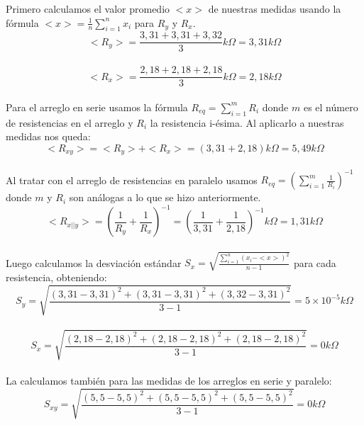 \documentclass[12pt]{article}
\begin{document}
	\noindent Primero calculamos el valor promedio $<x>$ de nuestras medidas usando la fórmula $<x> = \frac{1}{n}\sum_{i=1}^n x_i$ para $R_y$ y $R_x$.
	\\
	\begin{equation*}
		<R_y> = \frac{3,31 + 3,31 + 3,32}{3} k\Omega = 3,31 k\Omega
	\end{equation*}
	\\
	\begin{equation*}
		<R_x> = \frac{2,18 + 2,18 + 2,18}{3} k\Omega = 2,18 k\Omega
	\end{equation*}
	\\
	\noindent Para el arreglo en serie usamos la fórmula $R_{eq} = \sum_{i=1}^m R_i$ donde $m$ es el número de resistencias en el arreglo y $R_i$ la resistencia i-ésima. Al aplicarlo a nuestras medidas nos queda:\\
	\begin{equation*}
		<R_{xy}> = <R_y> + <R_x> = (3,31 + 2,18)k\Omega = 5,49k\Omega
	\end{equation*}
	\\
	\noindent Al tratar con el arreglo de resistencias en paralelo usamos $R_{eq} = (\sum_{i=1}^m \frac{1}{R_i})^{-1}$ donde $m$ y $R_i$ son análogas a lo que se hizo anteriormente.\\
	\begin{equation*}
		<R_{x||y}> = (\frac{1}{R_y} + \frac{1}{R_x})^{-1} = (\frac{1}{3,31} + \frac{1}{2,18})^{-1}k\Omega = 1,31k\Omega
	\end{equation*}
	\\
	\noindent Luego calculamos la desviación estándar $S_x = \sqrt{\frac{\sum_{i=1}^n(x_i - <x>)^2}{n - 1}}$ para cada resistencia, obteniendo:\\
	\begin{equation*}
		S_y = \sqrt{\frac{(3,31 - 3,31)^2 + (3,31 - 3,31)^2 + (3,32 - 3,31)^2}{3 - 1}} = 5 \times 10^{-5} k\Omega
	\end{equation*}
	\\
	\begin{equation*}
		S_x = \sqrt{\frac{(2,18 - 2,18)^2 + (2,18 - 2,18)^2 + (2,18 - 2,18)^2}{3 - 1}} = 0 k\Omega
	\end{equation*}
	\\
	\noindent La calculamos también para las medidas de los arreglos en serie y paralelo:\\
	\begin{equation*}
		S_{xy} = \sqrt{\frac{(5,5 - 5,5)^2 + (5,5 - 5,5)^2 + (5,5 - 5,5)^2}{3 - 1}} = 0 k\Omega
	\end{equation*}
\end{document}
